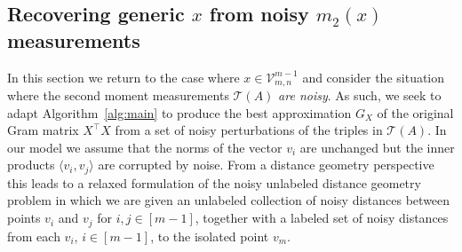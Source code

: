\documentclass{article}
\theoremstyle{definition}
\newcommand{\ip}[2]{\langle {#1}, {#2} \rangle}
\renewcommand{\|}{|}
\renewcommand{\t}{\mathcal{T}}
\newcommand{\V}{\mathcal{V}}
\begin{document}





\subsection{Recovering generic $x$ from noisy $m_2(x)$ measurements}\label{sec:noisyalg}
In this section we return to the case where $x\in \V_{m,n}^{m-1}$ and consider the situation where the second moment measurements $\t(A)$ \textit{are noisy}. As such, we seek to adapt Algorithm~\ref{alg:main} to produce the best approximation $G_X$ of the original Gram matrix $X^\top X$ from a
set of noisy perturbations of the triples in $\t(A)$. 
In our model we assume that the norms of the vector $v_i$ are unchanged but the inner products $\langle v_i, v_j \rangle$ are corrupted by noise. From a distance geometry perspective this leads to a relaxed formulation of the noisy unlabeled distance geometry problem in which we are given an unlabeled collection of noisy distances between points $v_i$ and $v_j$ for $i,j \in [m-1]$, together with a labeled set of noisy distances from each $v_i$, $i \in [m-1]$, to the isolated point $v_m$. 
%
\end{document}
